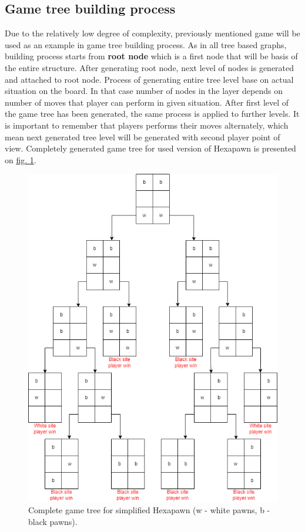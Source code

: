     \subsection{Game tree building process}\label{sec:game-tree-building-process}
    Due to the relatively low degree of complexity, previously mentioned game will be used as an example in game tree building process. As in all tree based graphs, building process starts from \textbf{root node} which is a first node that will be basis of the entire structure. After generating root node, next level of nodes is generated and attached to root node. Process of generating entire tree level base on actual situation on the board. In that case number of nodes in the layer depends on number of moves that player can perform in given situation. After first level of the game tree has been generated, the same process is applied to further levels. It is important to remember that players performs their moves alternately, which mean next generated tree level will be generated with second player point of view. Completely generated game tree for used version of Hexapawn is presented on \hyperref[fig:complete-game-tree-hexapawn]{fig. \ref*{fig:complete-game-tree-hexapawn}}.
    \begin{figure}
        \centering
        \includegraphics[width=\textwidth]{dependencies/pictures/Complete_Game_Tree.png}
        \caption{Complete game tree for simplified Hexapawn (w - white pawns, b - black pawns).}
        \label{fig:complete-game-tree-hexapawn}
    \end{figure}
